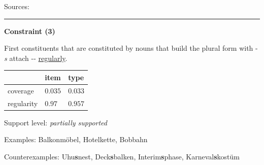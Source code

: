 \noindent
Sources: \citet[106]{ortner_mueller-bollhagen_1991}


\hrule




\vspace{0.4em}

\begin{center}
\textbf{Constraint (3)}
\end{center}

\noindent
First constituents that are constituted by nouns that build the plural form with -\textit{s} attach \mbox{-{\zeroLinker}-} \underline{regularly}.
\vspace{0.35em}


\vspace{-0.35em}

\begin{table}[!ht]
\begin{center}

\begin{tabularx}{\columnwidth}{|X|X|X|}
\hline
 & item & type \\
\hline
 coverage & $0.035$ & $0.033$ \\
\hline
 regularity & $0.97$ & $0.957$ \\
\hline
\end{tabularx}
\end{center}
\end{table}

\vspace{-1.35em}

\noindent
Support level: \textit{partially supported}

\vspace{0.3em}

\noindent
Examples: Balkon{\zeroLinker}möbel, Hotel{\zeroLinker}kette, Bob{\zeroLinker}bahn

\noindent
Counterexamples: Uhu\textbf{s}nest, Deck\textbf{s}balken, Interim\textbf{s}phase, Karneval\textbf{s}kostüm

